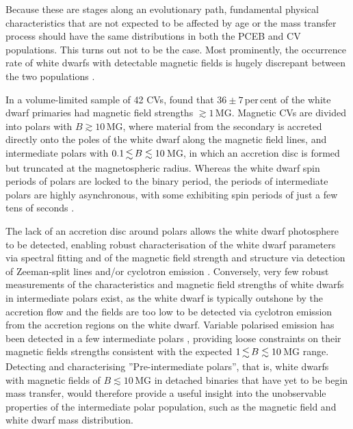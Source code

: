 \documentclass[fleqn,usenatbib]{mnras}
\newcommand{\bgc}[1]{\textcolor{orange}{[#1]}}
\begin{document}
Because these are stages along an evolutionary path, fundamental physical characteristics that are not expected to be affected by age or the mass transfer process should have the same distributions in both the PCEB and CV populations. This turns out not to be the case. Most prominently, the occurrence rate of white dwarfs with detectable magnetic fields is hugely discrepant between the two populations \citep{liebertetal05-2}. 

In a volume-limited sample of 42 CVs, \citet{palaetal20-1} found that $36\pm7$\,per\,cent of the white dwarf primaries had magnetic field strengths $\gtrsim 1$\,MG. Magnetic CVs are divided into polars with $B \gtrsim 10$\,MG, where material from the secondary is accreted directly onto the poles of the white dwarf along the magnetic field lines, and intermediate polars with  $0.1 \la B \lesssim 10$\,MG, in which an accretion disc is formed but truncated at the magnetospheric radius. Whereas the white dwarf spin periods of polars are locked to the binary period, the periods of intermediate polars are highly asynchronous, with some exhibiting spin periods of just a few tens of seconds \citep{patterson79-1,lopesdeoliveiraetal20-1}.     


The lack of an accretion disc around polars allows the white dwarf photosphere to be detected, enabling robust characterisation of the white dwarf parameters via spectral fitting and of the magnetic field strength and structure via detection of Zeeman-split lines and/or cyclotron emission \citep[e.g.][]{schwope90-1, gaensickeetal04-1, ferrarioetal95-1}. Conversely, very few robust measurements of the characteristics and magnetic field strengths of white dwarfs in intermediate polars exist, as the white dwarf is typically outshone by the accretion flow and the fields are too low to be detected via cyclotron emission from the accretion regions on the white dwarf. Variable polarised emission has been detected in a few intermediate polars \citep[e.g. ][]{potter+buckley18-1}, providing loose constraints on their magnetic fields strengths consistent with the expected $1 \la B \lesssim 10$\,MG range. Detecting and characterising ''Pre-intermediate polars'', that is, white dwarfs with magnetic fields of  $B \lesssim 10$\,MG in detached binaries that have yet to be begin mass transfer, would therefore provide a useful insight into the unobservable properties of the intermediate polar population, such as the magnetic field and white dwarf mass distribution. 
\end{document}
